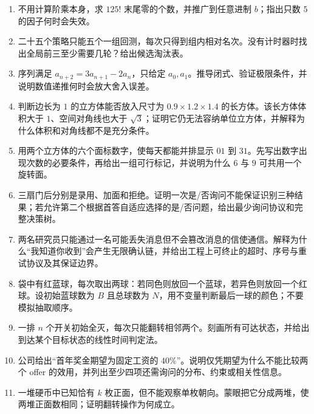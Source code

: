 \begin{enumerate}[leftmargin=*]
  \item {}不用计算阶乘本身，求 $125!$ 末尾零的个数，并推广到任意进制 $b$；指出只数 $5$ 的因子何时会失效。
  \item {}二十五个策略只能五个一组回测，每次只得到组内相对名次。没有计时器时找出全局前三至少需要几轮？给出候选淘汰表。
  \item {}序列满足 $a_{n+2}=3a_{n+1}-2a_n$，只给定 $a_0,a_1$。推导闭式、验证极限条件，并说明数值递推何时会放大舍入误差。
  \item {}判断边长为 $1$ 的立方体能否放入尺寸为 $0.9\times1.2\times1.4$ 的长方体。该长方体体积大于 $1$、空间对角线也大于 $\sqrt3$；证明它仍无法容纳单位立方体，并解释为什么体积和对角线都不是充分条件。
  \item {}用两个立方体的六个面标数字，使每天都能并排显示 $01$ 到 $31$。先写出数字出现次数的必要条件，再给出一组可行标记，并说明为什么 $6$ 与 $9$ 可共用一个旋转面。
  \item {}三扇门后分别是录用、加面和拒绝。证明一次是/否询问不能保证识别三种结果；若允许第二个根据首答自适应选择的是/否问题，给出最少询问协议和完整决策树。
  \item {}两名研究员只能通过一名可能丢失消息但不会篡改消息的信使通信。解释为什么“我知道你收到”会产生无限确认链，并给出工程上可终止的超时、序号与重试协议及其保证边界。
  \item {}袋中有红蓝球，每次取出两球：若同色则放回一个蓝球，若异色则放回一个红球。设初始蓝球数为 $B$ 且总球数为 $N$，用不变量判断最后一球的颜色；不要模拟抽取顺序。
  \item {}一排 $n$ 个开关初始全灭，每次只能翻转相邻两个。刻画所有可达状态，并给出到达某个目标状态的线性时间判定法。
  \item {}公司给出“首年奖金期望为固定工资的 $40\%$”。说明仅凭期望为什么不能比较两个 offer 的效用，并列出至少四项还需询问的分布、约束或相关性信息。
  \item {}一堆硬币中已知恰有 $k$ 枚正面，但不能观察单枚朝向。蒙眼把它分成两堆，使两堆正面数相同；证明翻转操作为何成立。

\end{enumerate}
